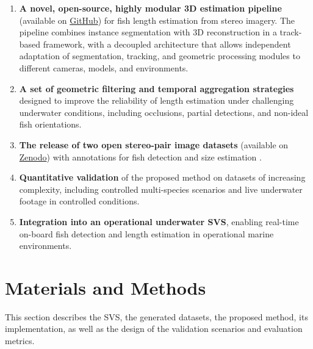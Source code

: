 \documentclass[utf8]{FrontiersinHarvard} %
\begin{document}
\begin{enumerate}[1)]
   
    \item \textbf{A novel, open-source, highly modular 3D estimation pipeline} (available on \href{https://github.com/Caterina1996/fish_sizing}{GitHub}) for fish length estimation from stereo imagery. The pipeline combines instance segmentation with 3D reconstruction in a track-based framework, with a decoupled architecture that allows independent adaptation of segmentation, tracking, and geometric processing modules to different cameras, models, and environments.

    \item \textbf{A set of geometric filtering and temporal aggregation strategies} designed to improve the reliability of length estimation under challenging underwater conditions, including occlusions, partial detections, and non-ideal fish orientations.

    \item \textbf{The release of two open stereo-pair image datasets} (available on \href{https://zenodo.org/records/19408363?preview=1&token=eyJhbGciOiJIUzUxMiJ9.eyJpZCI6ImUxOWVhZTRiLTMxYWYtNDY4NS05ZWVkLTRmMTQ4MDRjMTQ5NyIsImRhdGEiOnt9LCJyYW5kb20iOiIzNGNlYmY2NTNhZDUyN2JhODQ0ZTQ5ZmUzMjYxNjIyMiJ9.ehM6b0ys9Fhe_um9gSyPsoz74RgD4zvm7CaR_tQ9zWmRLXF7iGZRo6lrvu64bs-Jpd89VHTfYd9tgyfWH5cB0w}{Zenodo}) with annotations for fish detection and size estimation \citep{muntaner2026fishsizing}.

    \item \textbf{Quantitative validation} of the proposed method on datasets of increasing complexity, including controlled multi-species scenarios and live underwater footage in controlled conditions.

    \item \textbf{Integration into an operational underwater SVS}, enabling real-time on-board fish detection and length estimation in operational marine environments.

\end{enumerate}


\section{Materials and Methods}\label{sec::methodology}


This section describes the SVS, the generated datasets, the proposed method, its implementation, as well as the design of the validation scenarios and evaluation metrics.
\end{document}
